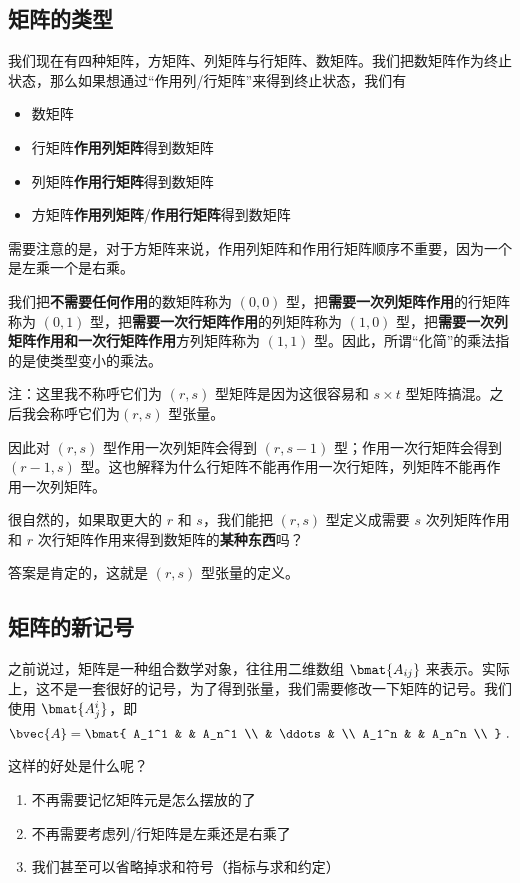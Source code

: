 \subsection{矩阵的类型}
我们现在有四种矩阵，方矩阵、列矩阵与行矩阵、数矩阵。我们把数矩阵作为终止状态，那么如果想通过“作用列/行矩阵”来得到终止状态，我们有
\begin{itemize}
\item 数矩阵
\item 行矩阵\textbf{作用列矩阵}得到数矩阵
\item 列矩阵\textbf{作用行矩阵}得到数矩阵
\item 方矩阵\textbf{作用列矩阵}/\textbf{作用行矩阵}得到数矩阵
\end{itemize}
需要注意的是，对于方矩阵来说，作用列矩阵和作用行矩阵顺序不重要，因为一个是左乘一个是右乘。

我们把\textbf{不需要任何作用}的数矩阵称为 $(0,0)$ 型，把\textbf{需要一次列矩阵作用}的行矩阵称为 $(0,1)$ 型，把\textbf{需要一次行矩阵作用}的列矩阵称为 $(1,0)$ 型，把\textbf{需要一次列矩阵作用和一次行矩阵作用}方列矩阵称为 $(1,1)$ 型。因此，所谓“化简”的乘法指的是使类型变小的乘法。

注：这里我不称呼它们为 $(r, s)$ 型矩阵是因为这很容易和 $s \times t$ 型矩阵搞混。之后我会称呼它们为$(r, s)$ 型张量。

因此对 $(r, s)$ 型作用一次列矩阵会得到 $(r, s - 1)$ 型；作用一次行矩阵会得到 $(r - 1, s)$ 型。这也解释为什么行矩阵不能再作用一次行矩阵，列矩阵不能再作用一次列矩阵。

很自然的，如果取更大的 $r$ 和 $s$，我们能把 $(r, s)$ 型定义成需要 $s$ 次列矩阵作用和 $r$ 次行矩阵作用来得到数矩阵的\textbf{某种东西}吗？

答案是肯定的，这就是 $(r, s)$ 型张量的定义。

\subsection{矩阵的新记号}

之前说过，矩阵是一种组合数学对象，往往用二维数组 $\bmat{A_{i j}}$ 来表示。实际上，这不是一套很好的记号，为了得到张量，我们需要修改一下矩阵的记号。我们使用 $\bmat{A^i_j}$，即
$$
\bvec{A} = \bmat{
A_1^1 &  & A_n^1 \\
 & \ddots & \\
A_1^n &  & A_n^n \\
}~.
$$

这样的好处是什么呢？
\begin{enumerate}
\item 不再需要记忆矩阵元是怎么摆放的了
\item 不再需要考虑列/行矩阵是左乘还是右乘了
\item 我们甚至可以省略掉求和符号（指标与求和约定）
\end{enumerate}

